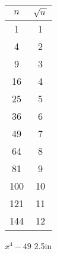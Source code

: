 \begin{minipage}{0.19\textwidth}
        \raggedleft
        \begin{tabular}{cc}
            \toprule
            $n$ & $\myRoot{n}$ \\
            \midrule
            1 & 1  \\
            4 & 2  \\
            9 & 3  \\
            16 & 4  \\
            25 & 5  \\
            36 & 6  \\
            49 & 7   \\
            64 & 8   \\
            81 & 9   \\
            100 & 10   \\
            121 & 11   \\
            144 & 12   \\
            \bottomrule
        \end{tabular}
\end{minipage}


{
    \centering 
    $ x^4 - 49$
}
{2.5in}

